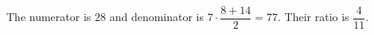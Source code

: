 The numerator is $28$ and denominator is $7\cdot\dfrac{8+14}{2}=77$. Their ratio is $\boxed{\dfrac{4}{11}}$.

